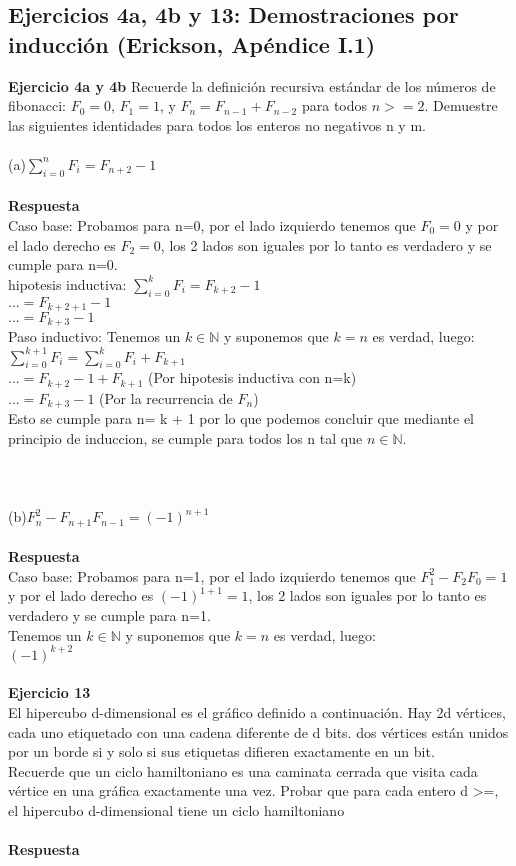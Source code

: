 \documentclass[a4paper,12pt]{article}
\begin{document}
\subsection{Ejercicios 4a, 4b y 13: Demostraciones por inducción (Erickson, Apéndice I.1)}
\textbf{Ejercicio 4a y 4b}
Recuerde la definición recursiva estándar de los números de fibonacci: $F_{0} = 0$, $F_{1} = 1$, y $F_{n} = F_{n-1} + F_{n-2}$ para todos $n> = 2$. Demuestre las siguientes identidades para todos los enteros no negativos n y m.\\\\
(a)$\sum_{i=0}^{n}F_{i} = F_{n+2}-1$\\\\
\textbf{Respuesta}\\
Caso base: Probamos para n=0, por el lado izquierdo tenemos que $F_{0} = 0$ y por el lado derecho es $F_{2} = 0$, los 2 lados son iguales  por lo tanto es verdadero y se cumple para n=0.\\
hipotesis inductiva: $\sum_{i=0}^{k}F_{i} = F_{k+2}-1$\\
$... = F_{k+2+1}- 1$\\
$... = F_{k+3} - 1$\\
Paso inductivo: Tenemos un $k \in \mathbb{N}$ y suponemos que $k = n$ es verdad, luego:\\
$\sum_{i=0}^{k+1}F_{i} = \sum_{i=0}^{k}F_{i}+F_{k+1}$\\
$ ... = F_{k+2}-1 + F_{k+1}$ (Por hipotesis inductiva con n=k)\\
$ ... = F_{k+3}-1$ (Por la recurrencia de $F_{n}$)\\
Esto se cumple para  n= k + 1 por lo que podemos concluir que mediante el principio de induccion, se cumple para todos los n tal que $n \in \mathbb{N}$.\\
\cite{illinois}\\\\\\
(b)$F_{n}^2 - F_{n+1}F_{n-1} = (-1)^{n+1}$\\\\
\textbf{Respuesta}\\
Caso base: Probamos para n=1, por el lado izquierdo tenemos que $F_{1}^2-F_{2}F_{0} = 1$ y por el lado derecho es $(-1)^{1+1} = 1$, los 2 lados son iguales  por lo tanto es verdadero y se cumple para n=1.\\
Tenemos un $k \in \mathbb{N}$ y suponemos que $k = n$ es verdad, luego:\\
$(-1)^{k+2}$\\\\
\textbf{Ejercicio 13}\\
El hipercubo d-dimensional es el gráfico definido a continuación. Hay 2d vértices, cada uno etiquetado con una cadena diferente de d bits. dos vértices están unidos por un borde si y solo si sus etiquetas difieren exactamente en un bit.\\
Recuerde que un ciclo hamiltoniano es una caminata cerrada que visita cada vértice en una gráfica exactamente una vez. Probar que para cada entero d >=, el hipercubo d-dimensional tiene un ciclo hamiltoniano\\\\
\textbf{Respuesta}\\
\end{document}
